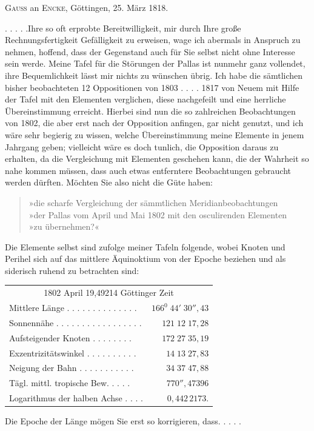 \par{}\bigskip
\begin{center}
\textsc{Gauss} an \textsc{Encke}, Göttingen, 25. März 1818.
\end{center}
\noindent\hspace*{\parindent}. . . . .\quad Ihre so oft erprobte Bereitwilligkeit, mir durch Ihre große Rechnungsfertigkeit Gefälligkeit zu erweisen, wage ich abermals in Anspruch zu nehmen, hoffend, dass der Gegenstand auch für Sie selbst nicht ohne Interesse sein werde. Meine Tafel für die Störungen der Pallas ist nunmehr ganz vollendet, ihre Bequemlichkeit lässt mir nichts zu wünschen übrig. Ich habe die sämtlichen bisher beobachteten 12 Oppositionen von 1803 . . . . 1817 von Neuem mit Hilfe der Tafel mit den Elementen verglichen, diese nachgefeilt und eine herrliche Übereinstimmung erreicht. Hierbei sind nun die so zahlreichen Beobachtungen von 1802, die aber erst nach der Opposition anfingen, gar nicht genutzt, und ich wäre sehr begierig zu wissen, welche Übereinstimmung meine Elemente in jenem Jahrgang geben; vielleicht wäre es doch tunlich, die Opposition daraus zu erhalten, da die Vergleichung mit Elementen geschehen kann, die der Wahrheit so nahe kommen müssen, dass auch etwas entferntere Beobachtungen gebraucht werden dürften. Möchten Sie also nicht die Güte haben:
\begin{quote}\small
»die scharfe Vergleichung der sämmtlichen Meridianbeobachtungen\\
»der Pallas vom April und Mai 1802 mit den osculirenden Elementen\\
»zu übernehmen?«
\end{quote}
\par Die Elemente selbst sind zufolge meiner Tafeln folgende, wobei Knoten und Perihel sich auf das mittlere Äquinoktium von der Epoche beziehen und als siderisch ruhend zu betrachten sind:
\begin{center}
\begingroup\small\setlength{\tabcolsep}{4pt}
\begin{tabular}{@{}lr@{}}
\multicolumn{2}{c}{1802 April 19,49214 Göttinger Zeit}\\[3pt]
Mittlere Länge . . . . . . . . . . . . . .&\(166^0\;44'\;30''{,}43\)\\
Sonnennähe . . . . . . . . . . . . . . . . .&\(121\;12\;17{,}28\)\\
Aufsteigender Knoten . . . . . . . .&\(172\;27\;35{,}19\)\\
Exzentrizitätswinkel . . . . . . . . . .&\(14\;13\;27{,}83\)\\
Neigung der Bahn . . . . . . . . . . .&\(34\;37\;47{,}88\)\\
Tägl. mittl. tropische Bew. . . . .&\(770''{,}47396\)\\
Logarithmus der halben Achse . . . .&\(0{,}442\,2173.\)
\end{tabular}
\endgroup
\end{center}
\noindent Die Epoche der Länge mögen Sie erst so korrigieren, dass\quad . . . . .
\par
